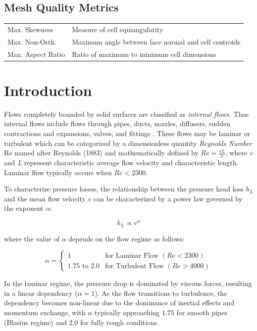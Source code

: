 \documentclass[12pt, a4paper]{article}
\begin{document}
\subsection*{Mesh Quality Metrics}
\begin{tabular}{ll}
	Max. Skewness       & Measure of cell equiangularity                  \\
	Max. Non-Orth.      & Maximum angle between face normal and cell centroids \\
	Max. Aspect Ratio   & Ratio of maximum to minimum cell dimensions      \\
\end{tabular}
\newpage
\section{Introduction}
Flows completely bounded by solid surfaces are classified as \textit{internal flows.} Thus internal flows include flows through pipes, ducts, nozzles, diffusers, sudden contractions and expansions, valves, and fittings \cite{fox2020}.
These flows may be laminar or turbulent which can be categorized by a dimensionless quantity \textit{Reynolds Number} Re named after Reynolds (1883) and mathematically defined by $Re = \frac{v L}{\nu}$, where \textit{v} and \textit{L} represent characteristic average flow velocity and characteristic length. Laminar flow typically occurs when $Re < 2300$. 

To characterize pressure losses, the relationship between the pressure head loss $h_L$ and the mean flow velocity $v$ can be characterized by a power law governed by the exponent $\alpha$:

\begin{equation}
	h_L \propto v^{\alpha}
\end{equation}

where the value of $\alpha$ depends on the flow regime as follows:

\begin{equation}
	\alpha = 
	\begin{cases} 
		1 & \text{for Laminar Flow } (Re < 2300) \\
		1.75 \text{ to } 2.0 & \text{for Turbulent Flow } (Re > 4000)
	\end{cases}
\end{equation}

In the laminar regime, the pressure drop is dominated by viscous forces, resulting in a linear dependency ($\alpha = 1$). As the flow transitions to turbulence, the dependency becomes non-linear due to the dominance of inertial effects and momentum exchange, with $\alpha$ typically approaching $1.75$ for smooth pipes (Blasius regime) and $2.0$ for fully rough conditions.\cite{white2016}
\end{document}
